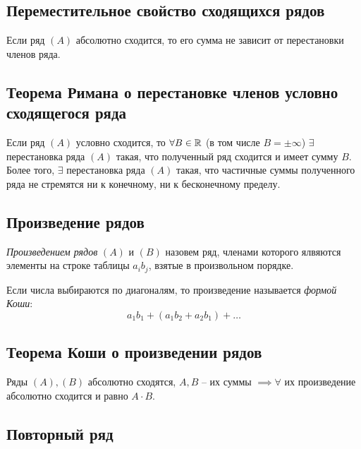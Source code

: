 \subsection{Переместительное свойство сходящихся рядов}

\begin{theorem}
    Если ряд $(A)$ абсолютно сходится, то его сумма не зависит от перестановки членов ряда.
\end{theorem}

\subsection{Теорема Римана о перестановке членов условно сходящегося ряда}

\begin{theorem}
    Если ряд $(A)$ условно сходится, то $\forall B \in \mathbb{R}$ (в том числе $B = \pm\infty$) $\exists$ перестановка ряда $(A)$ такая, что полученный ряд сходится и имеет сумму $B$. Более того, $\exists$ перестановка ряда $(A)$ такая, что частичные суммы полученного ряда не стремятся ни к конечному, ни к бесконечному пределу.
\end{theorem}

\subsection{Произведение рядов}

\begin{definition}
    \emph{Произведением рядов} $(A)$ и $(B)$ назовем ряд, членами которого ялвяются элементы на строке таблицы $a_ib_j$, взятые в произвольном порядке.

    Если числа выбираются по диагоналям, то произведение называется \emph{формой Коши}:
    \[
        a_1 b_1 + (a_1 b_2 + a_2 b_1) + \ldots
    \]
\end{definition}

\subsection{Теорема Коши о произведении рядов}

\begin{theorem}
    Ряды $ (A),(B) $ абсолютно сходятся, $A, B$ -- их суммы $\implies \forall$ их произведение абсолютно сходится и равно $A \cdot B$.
\end{theorem}

\newpage

\subsection{Повторный ряд}

